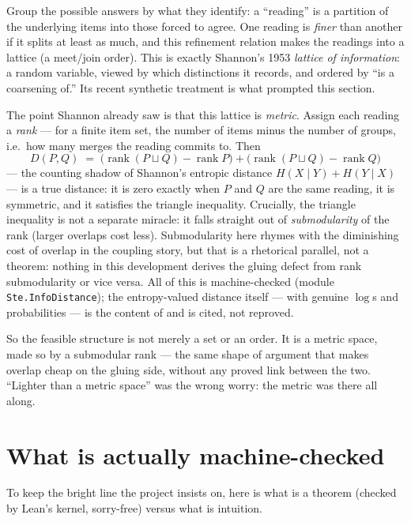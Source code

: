 \documentclass[11pt]{article}
\newcommand{\code}[1]{\texttt{#1}}
\begin{document}
Group the possible answers by what they identify: a ``reading'' is a
partition of the underlying items into those forced to agree.  One
reading is \emph{finer} than another if it splits at least as much, and
this refinement relation makes the readings into a lattice (a
meet/join order).  This is exactly Shannon's 1953 \emph{lattice of
information}: a random variable, viewed by which distinctions it
records, and ordered by ``is a coarsening of.''  Its recent synthetic
treatment \citep{delsol2024} is what prompted this section.

The point Shannon already saw is that this lattice is \emph{metric}.
Assign each reading a \emph{rank} --- for a finite item set, the number
of items minus the number of groups, i.e.\ how many merges the reading
commits to.  Then
\[
  D(P,Q) \;=\; \bigl(\operatorname{rank}(P\sqcup Q)-\operatorname{rank}
  P\bigr) + \bigl(\operatorname{rank}(P\sqcup Q)-\operatorname{rank}
  Q\bigr)
\]
--- the counting shadow of Shannon's entropic distance
$H(X\mid Y)+H(Y\mid X)$ --- is a true distance: it is zero exactly when
$P$ and $Q$ are the same reading, it is symmetric, and it satisfies the
triangle inequality.  Crucially, the triangle inequality is not a
separate miracle: it falls straight out of \emph{submodularity} of the
rank (larger overlaps cost less).  Submodularity here rhymes with the
diminishing cost of overlap in the coupling story, but that is a
rhetorical parallel, not a theorem: nothing in this development derives
the gluing defect from rank submodularity or vice versa.  All
of this is machine-checked (module \code{Ste.InfoDistance}); the
entropy-valued distance itself --- with genuine $\log$s and
probabilities --- is the content of \citet{delsol2024} and is cited, not
reproved.

So the feasible structure is not merely a set or an order.  It is a
metric space, made so by a submodular rank --- the same shape of
argument that makes overlap cheap on the gluing side, without any proved
link between the two.  ``Lighter than a metric space'' was the wrong worry:
the metric was there all along.

\section{What is actually machine-checked}
To keep the bright line the project insists on, here is what is a
theorem (checked by Lean's kernel, sorry-free) versus what is intuition.
\end{document}
